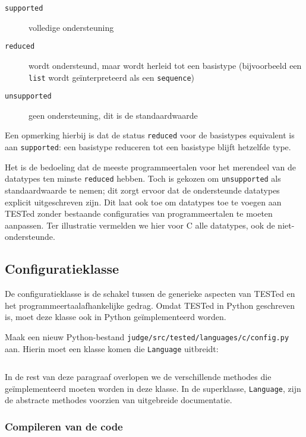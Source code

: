 \begin{description}
    \item[\texttt{supported}] volledige ondersteuning
    \item[\texttt{reduced}] wordt ondersteund, maar wordt herleid tot een basistype (bijvoorbeeld een \texttt{list} wordt geïnterpreteerd als een \texttt{sequence})
    \item[\texttt{unsupported}] geen ondersteuning, dit is de standaardwaarde
\end{description}

Een opmerking hierbij is dat de status \texttt{reduced} voor de basistypes equivalent is aan \texttt{supported}: een basistype reduceren tot een basistype blijft hetzelfde type.

Het is de bedoeling dat de meeste programmeertalen voor het merendeel van de datatypes ten minste \texttt{reduced} hebben.
Toch is gekozen om \texttt{unsupported} als standaardwaarde te nemen;
dit zorgt ervoor dat de ondersteunde datatypes explicit uitgeschreven zijn.
Dit laat ook toe om datatypes toe te voegen aan TESTed zonder bestaande configuraties van programmeertalen te moeten aanpassen.
Ter illustratie vermelden we hier voor C alle datatypes, ook de niet-ondersteunde.

\subsection{Configuratieklasse}\label{subsec:configuratieklasse}

De configuratieklasse is de schakel tussen de generieke aspecten van TESTed en het programmeertaalafhankelijke gedrag.
Omdat TESTed in Python geschreven is, moet deze klasse ook in Python geïmplementeerd worden.

Maak een nieuw Python-bestand \texttt{judge/src/tested/languages/c/config.py} aan.
Hierin moet een klasse komen die \texttt{Language} uitbreidt:

\inputminted[firstline=9,lastline=9]{python}{sources/c-config.py}

In de rest van deze paragraaf overlopen we de verschillende methodes die geïmplementeerd moeten worden in deze klasse.
In de superklasse, \texttt{Language}, zijn de abstracte methodes voorzien van uitgebreide documentatie.

\subsubsection{Compileren van de code}

